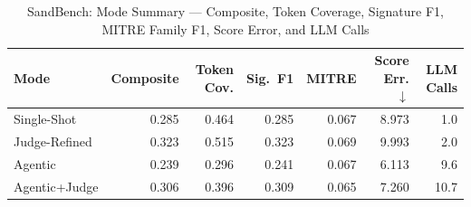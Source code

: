 \begin{table}[ht]
\centering
\caption{SandBench: Mode Summary --- Composite, Token Coverage, Signature F1, MITRE Family F1, Score Error, and LLM Calls}
\label{tab:mode_summary}
\begin{tabular}{lrrrrrr}
\toprule
\textbf{Mode} & \textbf{Composite} & \textbf{Token Cov.} & \textbf{Sig.\ F1} & \textbf{MITRE} & \textbf{Score Err.} $\downarrow$ & \textbf{LLM Calls} \\
\midrule
Single-Shot    & 0.285 & 0.464 & 0.285 & 0.067 & 8.973 & 1.0 \\
Judge-Refined  & 0.323 & 0.515 & 0.323 & 0.069 & 9.993 & 2.0 \\
Agentic        & 0.239 & 0.296 & 0.241 & 0.067 & 6.113 & 9.6 \\
Agentic+Judge  & 0.306 & 0.396 & 0.309 & 0.065 & 7.260 & 10.7 \\
\bottomrule
\end{tabular}
\end{table}